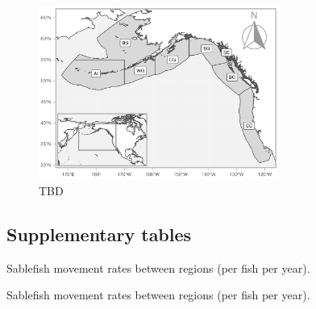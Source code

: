 \documentclass{article}
\begin{document}
\begin{figure}[htb]
    \centering
    \includegraphics[width = 0.7\textwidth]{map-regions-8}
    \caption{TBD}
    \label{fig:map-regions-8}
\end{figure}


\subsection{Supplementary tables}

\begin{table}[h]
  \begin{center}
  \caption{Sablefish movement rates between regions (per fish per year).}
  \label{tab:movement-rate-regions-3-mean}
  \end{center}
\end{table}

\begin{landscape}
\begin{table}[h]
  \begin{center}
  \caption{Sablefish movement rates between regions (per fish per year).}
  \label{tab:movement-rate-regions-8-mean}
  \end{center}
\end{table}
\end{landscape}
\end{document}
